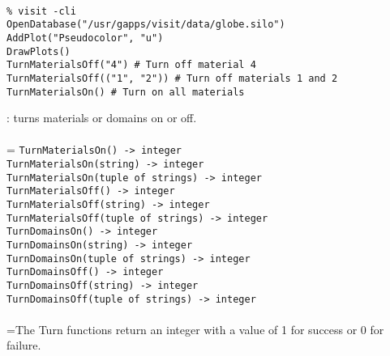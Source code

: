 \documentclass[10pt,a4paper]{report}
\begin{document}
\\[-6mm]
\begin{verbatim}% visit -cli
OpenDatabase("/usr/gapps/visit/data/globe.silo")
AddPlot("Pseudocolor", "u")
DrawPlots()
TurnMaterialsOff("4") # Turn off material 4
TurnMaterialsOff(("1", "2")) # Turn off materials 1 and 2
TurnMaterialsOn() # Turn on all materials
\end{verbatim}
\newpage


{}
: turns materials or domains on or off.\\[-3mm]

 \\ 
\hangindent=\parindent 
\verb!TurnMaterialsOn() -> integer!\\ 
\verb!TurnMaterialsOn(string) -> integer!\\ 
\verb!TurnMaterialsOn(tuple of strings) -> integer!\\ 
\verb!TurnMaterialsOff() -> integer!\\ 
\verb!TurnMaterialsOff(string) -> integer!\\ 
\verb!TurnMaterialsOff(tuple of strings) -> integer!\\ 
\verb!TurnDomainsOn() -> integer!\\ 
\verb!TurnDomainsOn(string) -> integer!\\ 
\verb!TurnDomainsOn(tuple of strings) -> integer!\\ 
\verb!TurnDomainsOff() -> integer!\\ 
\verb!TurnDomainsOff(string) -> integer!\\ 
\verb!TurnDomainsOff(tuple of strings) -> integer!\\ [-3mm]

 \\ 
\hangindent=\parindent The Turn functions return an integer with a value of 1 for success or 0 for failure. \\[-3mm] 
\end{document}
